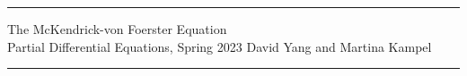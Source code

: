 \documentclass[11pt]{article}
\begin{document}
	\hrule
	\begin{center}
		{\Large The McKendrick-von Foerster Equation} \\ %
		\vspace{0.2cm}
		Partial Differential Equations, Spring 2023 \hfill David Yang and Martina Kampel%
	\end{center}

\hrule

\vspace{1em}








\printbibliography
\end{document}
